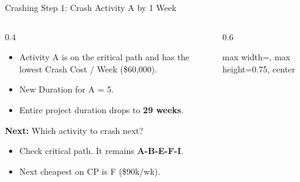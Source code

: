 \documentclass[11pt,aspectratio=169]{beamer}
\begin{document}
\begin{frame}{Crashing Step 1: Crash Activity A by 1 Week}
    \begin{columns}[T]
    \begin{column}{0.4\textwidth}
        \small
        \begin{itemize}
            \item Activity A is on the critical path and has the lowest Crash Cost / Week (\$60,000).
            \item New Duration for A = 5.
            \item Entire project duration drops to \textbf{29 weeks}.
        \end{itemize}
        \vspace{1em}
        \textbf{Next:} Which activity to crash next?
        \begin{itemize}
            \item Check critical path. It remains \textbf{A-B-E-F-I}.
            \item Next cheapest on CP is F (\$90k/wk).
        \end{itemize}
    \end{column}
    \begin{column}{0.6\textwidth}
        \begin{adjustbox}{max width=\linewidth, max height=0.75\textheight, center}
\end{adjustbox}
\end{column}
\end{columns}
\end{frame}
\end{document}
